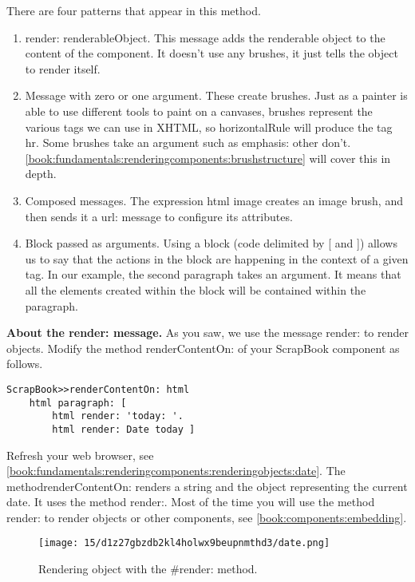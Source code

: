 \documentclass[a4paper,10pt,twoside]{book}
\newcommand{\ct}[1]{{\small\ttfamily\textup{#1}}}
\begin{document}
There are four patterns that appear in this method.

\begin{enumerate}
\item  \ct{render: renderableObject}. This message adds the renderable object to the content of the component. It doesn't use any brushes, it just tells the object to render itself. 
\item  Message with zero or one argument. These create brushes. Just as a painter is able to use different tools to paint on a canvases, brushes represent the various tags we can use in XHTML, so \ct{horizontalRule} will produce the tag \ct{hr}. Some brushes take an argument such as \ct{emphasis:} other don't. \autoref{book:fundamentals:renderingcomponents:brushstructure} will cover this in depth. 
\item  Composed messages. The expression \ct{html image} creates an image brush, and then sends it a \ct{url:} message to configure its attributes.
\item  Block passed as arguments. Using a block (code delimited by \ct{{[}} and \ct{{]}}) allows us to say that the actions in the block are happening in the context of a given tag. In our example, the second paragraph takes an argument. It means that all the elements created within the block will be contained within the paragraph.
\end{enumerate}

\textbf{About the \ct{render:} message.} As you saw, we use the message \ct{render:} to render objects. Modify the method \ct{renderContentOn:} of your ScrapBook component as follows.

\begin{lstlisting}
ScrapBook>>renderContentOn: html
    html paragraph: [
        html render: 'today: '.
        html render: Date today ]
\end{lstlisting}

Refresh your web browser, see \autoref{book:fundamentals:renderingcomponents:renderingobjects:date}. The method\ct{renderContentOn:} renders a string and the object representing the current date. It uses the method \ct{render:}. Most of the time you will use the method \ct{render:} to render objects or other components, see \autoref{book:components:embedding}.

\begin{figure}[h!tbp]
	\begin{center}
		\texttt{[image: 15/d1z27gbzdb2kl4holwx9beupnmthd3/date.png]}
		\caption{Rendering object with the \#render: method.\label{book:fundamentals:renderingcomponents:renderingobjects:date}}
	\end{center}
\end{figure}
\end{document}
